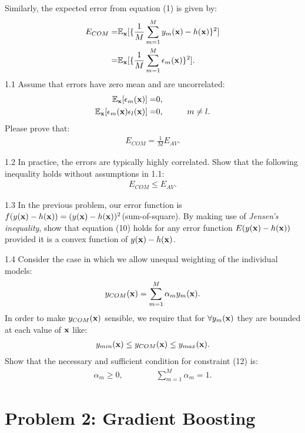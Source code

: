 \documentclass{article}
\theoremstyle{definition}
\theoremstyle{definition}
\theoremstyle{remark}
\begin{document}
Similarly, the expected error from equation (1) is given by:
\begin{eqnarray}
E_{COM}=&\mathbb{E}_{\bold{x}}[\{\frac{1}{M}\sum_{m=1}^{M}y_{m}(\bold{x})-h(\bold{x})\}^{2}] \\
=&\mathbb{E}_{\bold{x}}[\{\frac{1}{M}\sum_{m=1}^{M}\epsilon_{m}(\bold{x})\}^{2}].\qquad\quad
\end{eqnarray}
1.1 Assume that errors have zero mean and are uncorrelated:
\begin{eqnarray}
\mathbb{E}_{\bold{x}}[\epsilon_{m}(\bold{x})]=&0,& \\
\mathbb{E}_{\bold{x}}[\epsilon_{m}(\bold{x})\epsilon_{l}(\bold{x})]=&0,& \qquad m\neq l.
\end{eqnarray}
Please prove that:
\begin{eqnarray}
E_{COM}=\frac{1}{M}E_{AV}.
\end{eqnarray}

1.2 In practice, the errors are typically highly correlated. Show that the following inequality holds without assumptions in 1.1:
\begin{eqnarray}
E_{COM}\leq E_{AV}.
\end{eqnarray}

1.3 In the previous problem, our error function is $f(y(\bold{x})-h(\bold{x}))=(y(\bold{x})-h(\bold{x}))^{2}$(sum-of-square). By making use of \emph{Jensen's inequality}, show that equation (10) holds for any error function $E(y(\bold{x})-h(\bold{x}))$ provided it is a convex function of $y(\bold{x})-h(\bold{x})$.

1.4 Consider the case in which we allow unequal weighting of the individual models:
\begin{eqnarray}
y_{COM}(\bold{x})=\sum_{m=1}^{M}\alpha_{m}y_{m}(\bold{x}).
\end{eqnarray}
In order to make $y_{COM}(\bold{x})$ sensible, we require that for ${\forall} y_{m}(\bold{x})$ they are bounded at each value of $\bold{x}$ like:
\begin{eqnarray}
y_{min}(\bold{x})\leq y_{COM}(\bold{x})\leq y_{max}(\bold{x}).
\end{eqnarray}
Show that the necessary and sufficient condition for constraint (12) is:
\begin{eqnarray}
\alpha_{m}\geq 0, \qquad \qquad \sum_{m=1}^{M}\alpha_{m}=1.
\end{eqnarray}

\section*{Problem 2: Gradient Boosting}\label{problem:2}
\end{document}
